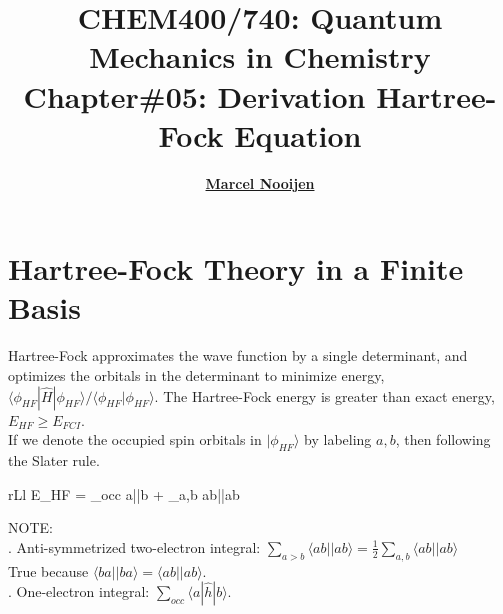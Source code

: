 \documentclass[a4paper, 12pt]{article}
\begin{document}
\title{\bf {CHEM400/740: Quantum Mechanics in Chemistry\\ Chapter\#05: Derivation Hartree-Fock Equation}} \author{\bf
  \href{http://scienide2.uwaterloo.ca/~nooijen/website_new_20_10_2011/About.html}{Marcel Nooijen}} \date{}
  
\pagestyle{fancy} \fancyhead[L]{\textcolor{PrimaryColor}{CHEM400/740: Quantum Mechanics in Chemistry}} \fancyhead[R]{\textcolor{PrimaryColor}{2021 Winter}}


\maketitle
\tableofcontents

\clearpage


\section{Hartree-Fock Theory in a Finite Basis}

Hartree-Fock approximates the wave function by a single determinant, and optimizes the orbitals in the determinant to minimize energy, $\langle \phi_{HF}|\hat{H}|\phi_{HF} \rangle /\langle \phi_{HF}| \phi_{HF} \rangle $. The Hartree-Fock energy is greater than exact energy, $E_{HF}\geqslant E_{FCI}$.\\
\tab If we denote the occupied spin orbitals in $|\phi_{HF}\rangle$ by labeling $a,b$, then following the Slater rule.
	\begin{IEEEeqnarray}{rLl}
E_{HF} = \sum_{occ} \langle a||b \rangle + \sum_{a,b} \langle ab||ab \rangle 
	\end{IEEEeqnarray}
\tab NOTE:\\
\tab{}. Anti-symmetrized two-electron integral: $\sum_{a>b}\langle ab||ab\rangle = \frac{1}{2}\sum_{a,b}\langle ab||ab \rangle$\\
\tab\tab\quad True because $\langle ba||ba\rangle =\langle ab||ab\rangle$. \\
\tab{}. One-electron integral: $\sum_{occ} \langle a|\hat{h}|b \rangle$.
\end{document}
